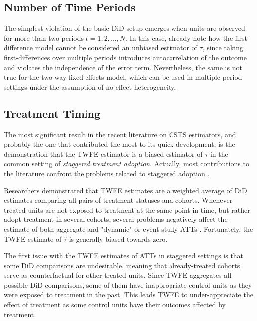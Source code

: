 \documentclass[hidelinks]{article}\usepackage[]{graphicx}\usepackage[]{xcolor}
\begin{document}
\subsection{Number of Time Periods}

The simplest violation of the basic DiD setup emerges when units are observed for more than two periods $t=1, 2, \dots, N$. In this case, \textcite{Angrist2009} already note how the first-difference model cannot be considered an unbiased estimator of $\tau$, since taking first-differences over multiple periods introduces autocorrelation of the outcome and violates the independence of the error term. Nevertheless, the same is not true for the two-way fixed effects model, which can be used in multiple-period settings under the assumption of no effect heterogeneity.

\subsection{Treatment Timing}

The most significant result in the recent literature on CSTS estimators, and probably the one that contributed the most to its quick development, is the demonstration that the TWFE estimator is a biased estimator of $\tau$ in the common setting of \textit{staggered treatment adoption}. Actually, most contributions to the literature confront the problems related to staggered adoption \parencite[see][]{Chaisemartin2022}.

Researchers demonstrated that TWFE estimates are a weighted average of DiD estimates comparing all pairs of treatment statuses and cohorts. Whenever treated units are not exposed to treatment at the same point in time, but rather adopt treatment in several cohorts, several problems negatively affect the estimate of both aggregate  \parencite{GoodmanBacon2021, Callaway2021, Chaisemartin2022} and "dynamic" or event-study ATTs \parencite{Sun2021}. Fortunately, the TWFE estimate of $\hat{\tau}$ is generally biased towards zero.

The first issue with the TWFE estimates of ATTs in staggered settings is that some DiD comparisons are undesirable, meaning that already-treated cohorts serve as counterfactual for other treated units. Since TWFE aggregates all possible DiD comparisons, some of them have inappropriate control units as they were exposed to treatment in the past. This leads TWFE to under-appreciate the effect of treatment as some control units have their outcomes affected by treatment.
\end{document}
